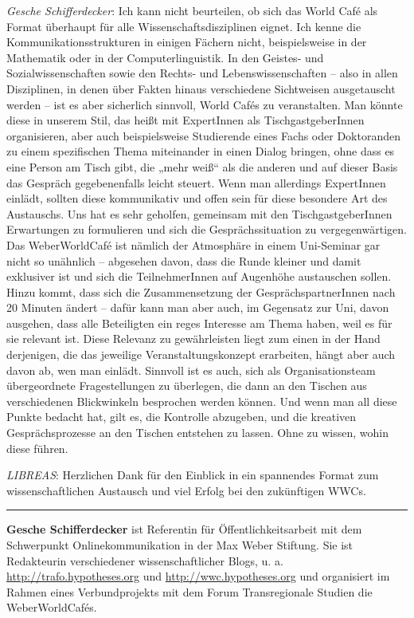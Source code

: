 \documentclass[a4paper,
fontsize=11pt,
oneside,
numbers=noperiodatend,
parskip=half-,
bibliography=totoc,
final
]{scrartcl}
\begin{document}
\emph{Gesche Schifferdecker}: Ich kann nicht beurteilen, ob sich das
World Café als Format überhaupt für alle Wissenschaftsdisziplinen
eignet. Ich kenne die Kommunikationsstrukturen in einigen Fächern nicht,
beispielsweise in der Mathematik oder in der Computerlinguistik. In den
Geistes- und Sozialwissenschaften sowie den Rechts- und
Lebenswissenschaften -- also in allen Disziplinen, in denen über Fakten
hinaus verschiedene Sichtweisen ausgetauscht werden -- ist es aber
sicherlich sinnvoll, World Cafés zu veranstalten. Man könnte diese in
unserem Stil, das heißt mit ExpertInnen als TischgastgeberInnen
organisieren, aber auch beispielsweise Studierende eines Fachs oder
Doktoranden zu einem spezifischen Thema miteinander in einen Dialog
bringen, ohne dass es eine Person am Tisch gibt, die „mehr weiß`` als
die anderen und auf dieser Basis das Gespräch gegebenenfalls leicht
steuert. Wenn man allerdings ExpertInnen einlädt, sollten diese
kommunikativ und offen sein für diese besondere Art des Austauschs. Uns
hat es sehr geholfen, gemeinsam mit den TischgastgeberInnen Erwartungen
zu formulieren und sich die Gesprächssituation zu vergegenwärtigen. Das
WeberWorldCafé ist nämlich der Atmosphäre in einem Uni-Seminar gar nicht
so unähnlich -- abgesehen davon, dass die Runde kleiner und damit
exklusiver ist und sich die TeilnehmerInnen auf Augenhöhe austauschen
sollen. Hinzu kommt, dass sich die Zusammensetzung der
GesprächspartnerInnen nach 20 Minuten ändert -- dafür kann man aber
auch, im Gegensatz zur Uni, davon ausgehen, dass alle Beteiligten ein
reges Interesse am Thema haben, weil es für sie relevant ist. Diese
Relevanz zu gewährleisten liegt zum einen in der Hand derjenigen, die
das jeweilige Veranstaltungskonzept erarbeiten, hängt aber auch davon
ab, wen man einlädt. Sinnvoll ist es auch, sich als Organisationsteam
übergeordnete Fragestellungen zu überlegen, die dann an den Tischen aus
verschiedenen Blickwinkeln besprochen werden können. Und wenn man all
diese Punkte bedacht hat, gilt es, die Kontrolle abzugeben, und die
kreativen Gesprächsprozesse an den Tischen entstehen zu lassen. Ohne zu
wissen, wohin diese führen.

\emph{LIBREAS}: Herzlichen Dank für den Einblick in ein spannendes
Format zum wissenschaftlichen Austausch und viel Erfolg bei den
zukünftigen WWCs.

\begin{center}\rule{0.5\linewidth}{\linethickness}\end{center}

\textbf{Gesche Schifferdecker} ist Referentin für Öffentlichkeitsarbeit
mit dem Schwerpunkt Onlinekommunikation in der Max Weber Stiftung. Sie
ist Redakteurin verschiedener wissenschaftlicher Blogs, u. a.
\url{http://trafo.hypotheses.org} und \url{http://wwc.hypotheses.org}
und organisiert im Rahmen eines Verbundprojekts mit dem Forum
Transregionale Studien die WeberWorldCafés.
\end{document}
